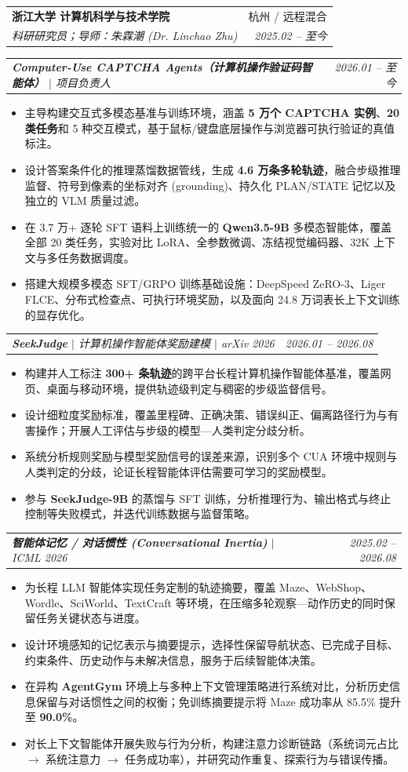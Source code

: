 \documentclass[letterpaper,11pt]{article}
\makeatletter
\newcommand{\resumeItem}[1]{
  \item\small{%
    {#1\vspace{-2pt}}%
  }
}
\newcommand{\resumeSubheading}[4]{
  \vspace{-2pt}\item
    \begin{tabular*}{0.97\textwidth}[t]{l@{\extracolsep{\fill}}r}
      \textbf{#1} & #2 \\
      \textit{\small#3} & \textit{\small #4} \\
    \end{tabular*}\vspace{-7pt}
}
\newcommand{\resumeSubSubheading}[2]{
    \item
    \begin{tabular*}{0.97\textwidth}{l@{\extracolsep{\fill}}r}
      \textit{\small#1} & \textit{\small #2} \\
    \end{tabular*}\vspace{-7pt}
}
\newcommand{\resumeItemListStart}{\begin{itemize}}
\newcommand{\resumeItemListEnd}{\end{itemize}\vspace{-5pt}}
\makeatother
\begin{document}
  \resumeSubheading
    {浙江大学 计算机科学与技术学院}{杭州 / 远程混合}
    {科研研究员；导师：朱霖潮 (Dr. Linchao Zhu)}{2025.02 -- 至今}

  \resumeSubSubheading
    {\textbf{Computer-Use CAPTCHA Agents（计算机操作验证码智能体）} $|$ 项目负责人}{2026.01 -- 至今}
  \resumeItemListStart
    \resumeItem{主导构建交互式多模态基准与训练环境，涵盖 \textbf{5 万个 CAPTCHA 实例}、\textbf{20 类任务}和 5 种交互模式，基于鼠标/键盘底层操作与浏览器可执行验证的真值标注。}
    \resumeItem{设计答案条件化的推理蒸馏数据管线，生成 \textbf{4.6 万条多轮轨迹}，融合步级推理监督、符号到像素的坐标对齐 (grounding)、持久化 PLAN/STATE 记忆以及独立的 VLM 质量过滤。}
    \resumeItem{在 3.7 万+ 逐轮 SFT 语料上训练统一的 \textbf{Qwen3.5-9B} 多模态智能体，覆盖全部 20 类任务，实验对比 LoRA、全参数微调、冻结视觉编码器、32K 上下文与多任务数据调度。}
    \resumeItem{搭建大规模多模态 SFT/GRPO 训练基础设施：DeepSpeed ZeRO-3、Liger FLCE、分布式检查点、可执行环境奖励，以及面向 24.8 万词表长上下文训练的显存优化。}
  \resumeItemListEnd

  \resumeSubSubheading
    {\textbf{SeekJudge} $|$ 计算机操作智能体奖励建模 $|$ arXiv 2026}{2026.01 -- 2026.08}
  \resumeItemListStart
    \resumeItem{构建并人工标注 \textbf{300+ 条轨迹}的跨平台长程计算机操作智能体基准，覆盖网页、桌面与移动环境，提供轨迹级判定与稠密的步级监督信号。}
    \resumeItem{设计细粒度奖励标准，覆盖里程碑、正确决策、错误纠正、偏离路径行为与有害操作；开展人工评估与步级的模型—人类判定分歧分析。}
    \resumeItem{系统分析规则奖励与模型奖励信号的误差来源，识别多个 CUA 环境中规则与人类判定的分歧，论证长程智能体评估需要可学习的奖励模型。}
    \resumeItem{参与 \textbf{SeekJudge-9B} 的蒸馏与 SFT 训练，分析推理行为、输出格式与终止控制等失败模式，并迭代训练数据与监督策略。}
  \resumeItemListEnd

  \resumeSubSubheading
    {\textbf{智能体记忆 / 对话惯性 (Conversational Inertia)} $|$ ICML 2026}{2025.02 -- 2026.08}
  \resumeItemListStart
    \resumeItem{为长程 LLM 智能体实现任务定制的轨迹摘要，覆盖 Maze、WebShop、Wordle、SciWorld、TextCraft 等环境，在压缩多轮观察—动作历史的同时保留任务关键状态与进度。}
    \resumeItem{设计环境感知的记忆表示与摘要提示，选择性保留导航状态、已完成子目标、约束条件、历史动作与未解决信息，服务于后续智能体决策。}
    \resumeItem{在异构 \textbf{AgentGym} 环境上与多种上下文管理策略进行系统对比，分析历史信息保留与对话惯性之间的权衡；免训练摘要提示将 Maze 成功率从 85.5\% 提升至 \textbf{90.0\%}。}
    \resumeItem{对长上下文智能体开展失败与行为分析，构建注意力诊断链路（系统词元占比 $\rightarrow$ 系统注意力 $\rightarrow$ 任务成功率），并研究动作重复、探索行为与错误传播。}
  \resumeItemListEnd
\end{document}
